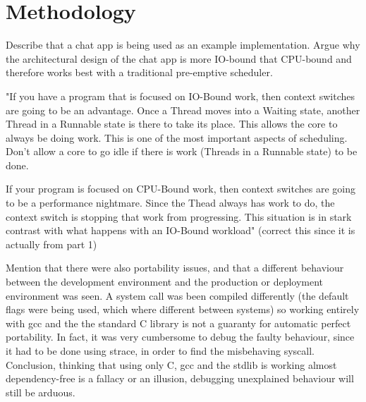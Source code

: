 \section{Methodology}
Describe that a chat app is being used as an example implementation. Argue why the architectural design of the chat app is more IO-bound that CPU-bound \cite{Kennedy2018} and therefore works best with a traditional pre-emptive scheduler.

"If you have a program that is focused on IO-Bound work, then context switches are going to be an advantage. Once a Thread moves into a Waiting state, another Thread in a Runnable state is there to take its place. This allows the core to always be doing work. This is one of the most important aspects of scheduling. Don’t allow a core to go idle if there is work (Threads in a Runnable state) to be done.

If your program is focused on CPU-Bound work, then context switches are going to be a performance nightmare. Since the Thead always has work to do, the context switch is stopping that work from progressing. This situation is in stark contrast with what happens with an IO-Bound workload"\cite{Kennedy2018} (correct this since it is actually from part 1)


Mention that there were also portability issues, and that a different behaviour between the development environment and the production or deployment environment was seen. A system call was been compiled differently (the default flags were being used, which where different between systems) so working entirely with gcc and the the standard C library is not a guaranty for automatic perfect portability. In fact, it was very cumbersome to debug the faulty behaviour, since it had to be done using strace, in order to find the misbehaving syscall. Conclusion, thinking that using only C, gcc and the stdlib is working almost dependency-free is a fallacy or an illusion, debugging unexplained behaviour will still be arduous.